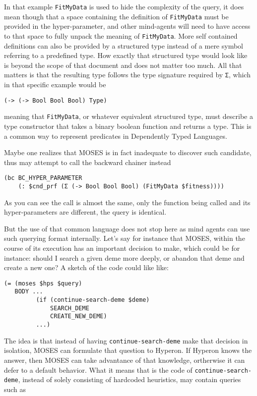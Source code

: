 \documentclass[]{report}
\begin{document}
In that example \texttt{FitMyData} is used to hide the complexity of
the query, it does mean though that a space containing the definition
of
\texttt{FitMyData} must be provided in the hyper-parameter, and other
mind-agents will need to have access to that space to fully unpack the
meaning of \texttt{FitMyData}.  More self contained definitions can also be
provided by a structured type instead of a mere symbol referring to a
predefined type.  How exactly that structured type would look like is
beyond the scope of that document and does not matter too much.  All
that matters is that the resulting type follows the type signature
required by \texttt{Σ}, which in that specific example would be

\begin{verbatim}
(-> (-> Bool Bool Bool) Type)
\end{verbatim}
meaning that \texttt{FitMyData}, or whatever equivalent structured type, must
describe a type constructor that takes a binary boolean function and
returns a type.  This is a common way to represent predicates in
Dependently Typed Languages.

Maybe one realizes that MOSES is in fact inadequate to discover such
candidate, thus may attempt to call the backward chainer instead

\begin{verbatim}
(bc BC_HYPER_PARAMETER
    (: $cnd_prf (Σ (-> Bool Bool Bool) (FitMyData $fitness))))
\end{verbatim}
As you can see the call is almost the same, only the function being
called and its hyper-parameters are different, the query is identical.

But the use of that common language does not stop here as mind agents
can use such querying format internally.  Let's say for instance that
MOSES, within the course of its execution has an important decision to
make, which could be for instance: should I search a given deme more
deeply, or abandon that deme and create a new one?  A sketch of the
code could like like:

\begin{verbatim}
(= (moses $hps $query)
   BODY ...
         (if (continue-search-deme $deme)
             SEARCH_DEME
             CREATE_NEW_DEME)
         ...)
\end{verbatim}
The idea is that instead of having \texttt{continue-search-deme} make
that decision in isolation, MOSES can formulate that question to
Hyperon.  If Hyperon knows the answer, then MOSES can take advantance
of that knowledge, ortherwise it can defer to a default behavior.
What it means that is the code of \texttt{continue-search-deme},
instead of solely consisting of hardcoded heuristics, may contain
queries such as
\end{document}
